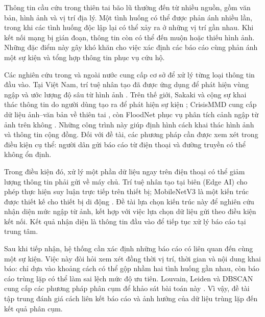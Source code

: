 \label{chap:introduction}


Thông tin cầu cứu trong thiên tai bão lũ thường đến từ nhiều nguồn, gồm văn bản, hình ảnh và vị trí địa lý. Một tình huống có thể được phản ánh nhiều lần, trong khi các tình huống độc lập lại có thể xảy ra ở những vị trí gần nhau. Khi kết nối mạng bị gián đoạn, thông tin còn có thể đến muộn hoặc thiếu hình ảnh. Những đặc điểm này gây khó khăn cho việc xác định các báo cáo cùng phản ánh một sự kiện và tổng hợp thông tin phục vụ cứu hộ.

Các nghiên cứu trong và ngoài nước cung cấp cơ sở để xử lý từng loại thông tin đầu vào. Tại Việt Nam, trí tuệ nhân tạo đã được ứng dụng để phát hiện vùng ngập và ước lượng độ sâu từ hình ảnh \citep{doan2025sar,ngo2025urban}. Trên thế giới, Sakaki và cộng sự khai thác thông tin do người dùng tạo ra để phát hiện sự kiện \citep{sakaki2010earthquake}; CrisisMMD cung cấp dữ liệu ảnh--văn bản về thiên tai \citep{alam2018crisismmd}, còn FloodNet phục vụ phân tích cảnh ngập từ ảnh trên không \citep{rahnemoonfar2021floodnet}. Những công trình này giúp định hình cách khai thác hình ảnh và thông tin cộng đồng. Đối với đề tài, các phương pháp cần được xem xét trong điều kiện cụ thể: người dân gửi báo cáo từ điện thoại và đường truyền có thể không ổn định.

Trong điều kiện đó, xử lý một phần dữ liệu ngay trên điện thoại có thể giảm lượng thông tin phải gửi về máy chủ. Trí tuệ nhân tạo tại biên (Edge AI) cho phép thực hiện suy luận trực tiếp trên thiết bị; MobileNetV3 là một kiến trúc được thiết kế cho thiết bị di động \citep{howard2019mobilenetv3}. Đề tài lựa chọn kiến trúc này để nghiên cứu nhận diện mức ngập từ ảnh, kết hợp với việc lựa chọn dữ liệu gửi theo điều kiện kết nối. Kết quả nhận diện là thông tin đầu vào để tiếp tục xử lý báo cáo tại trung tâm.

Sau khi tiếp nhận, hệ thống cần xác định những báo cáo có liên quan đến cùng một sự kiện. Việc này đòi hỏi xem xét đồng thời vị trí, thời gian và nội dung khai báo: chỉ dựa vào khoảng cách có thể gộp nhầm hai tình huống gần nhau, còn báo cáo trùng lặp có thể làm sai lệch mức độ ưu tiên. Louvain, Leiden và DBSCAN cung cấp các phương pháp phân cụm để khảo sát bài toán này \citep{blondel2008louvain,traag2019leiden,ester1996dbscan}. Vì vậy, đề tài tập trung đánh giá cách liên kết báo cáo và ảnh hưởng của dữ liệu trùng lặp đến kết quả phân cụm.

